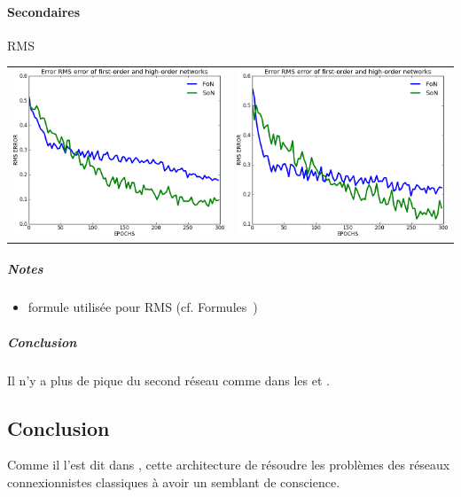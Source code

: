     \paragraph{Secondaires}
      RMS
      \begin{center}
	\begin{tabular}{lr}
	  \hspace*{-1cm}
	  \includegraphics[width=250px]{data/expC3/rms_5.png}
	  &
	  \includegraphics[width=250px]{data/expC3/rms_100.png} 
	\end{tabular}
      \end{center} 
      \subparagraph{Notes}
	\begin{itemize}
	  \item formule utilisée pour RMS (cf. Formules~)
	\end{itemize}
      \subparagraph{Conclusion}
	Il n'y a plus de pique du second réseau comme dans les  et .


  \subsection{Conclusion}
        Comme il l'est dit dans \cite{Cleeremans_2007}, cette architecture de résoudre les problèmes des réseaux connexionnistes
    classiques à avoir un semblant de conscience.
    
